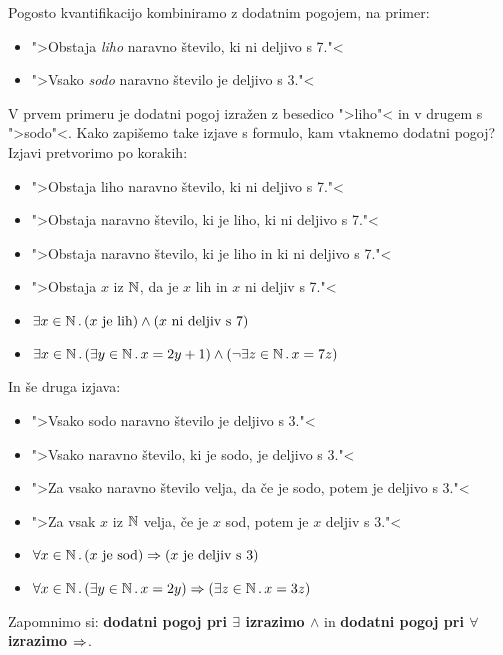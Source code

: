 Pogosto kvantifikacijo kombiniramo z dodatnim pogojem, na primer:
%
\begin{itemize}
\item ">Obstaja \emph{liho} naravno število, ki ni deljivo s 7."<
\item ">Vsako \emph{sodo} naravno število je deljivo s 3."<
\end{itemize}
%
V prvem primeru je dodatni pogoj izražen z besedico ">liho"< in v drugem s ">sodo"<. Kako zapišemo take izjave s formulo, kam
vtaknemo dodatni pogoj? Izjavi pretvorimo po korakih:
%
\begin{itemize}
\item ">Obstaja liho naravno število, ki ni deljivo s 7."<
\item ">Obstaja naravno število, ki je liho, ki ni deljivo s 7."<
\item ">Obstaja naravno število, ki je liho in ki ni deljivo s 7."<
\item ">Obstaja $x$ iz $\mathbb{N}$, da je $x$ lih in $x$ ni deljiv s 7."<
\item $\exists x \in \mathbb{N} \,.\, (\text{$x$ je lih}) \land (\text{$x$ ni deljiv s 7})$
\item $\exists x \in \mathbb{N} \,.\, (\exists y \in \mathbb{N} \,.\, x = 2 y + 1) \land (\neg \exists z \in \mathbb{N} \,.\, x = 7 z)$
\end{itemize}
%
In še druga izjava:
\begin{itemize}
\item ">Vsako sodo naravno število je deljivo s 3."<
\item ">Vsako naravno število, ki je sodo, je deljivo s 3."<
\item ">Za vsako naravno število velja, da če je sodo, potem je deljivo s 3."<
\item ">Za vsak $x$ iz $\mathbb{N}$ velja, če je $x$ sod, potem je $x$ deljiv s $3$."<
\item $\forall x \in \mathbb{N} \,.\, (\text{$x$ je sod}) \Rightarrow (\text{$x$ je deljiv s 3})$
\item $\forall x \in \mathbb{N} \,.\, (\exists y \in \mathbb{N} \,.\, x = 2 y) \Rightarrow (\exists z \in \mathbb{N} \,.\, x = 3 z)$
\end{itemize}
%
Zapomnimo si: \textbf{dodatni pogoj pri $\exists$ izrazimo $\land$} in \textbf{dodatni pogoj pri $\forall$ izrazimo $\Rightarrow$}.

